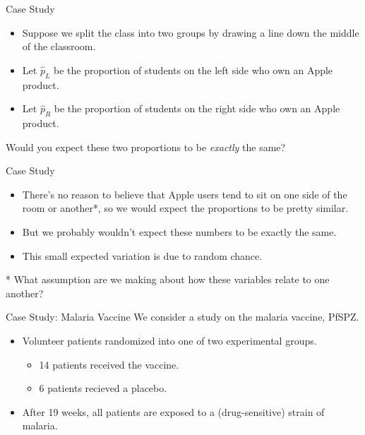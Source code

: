 \begin{frame}{Case Study}
    \begin{itemize}
        \item Suppose we split the class into two groups by drawing a line down the middle of the classroom.
        \item Let $\hat{p}_L$ be the proportion of students on the left side who own an Apple product.
        \item Let $\hat{p}_R$ be the proportion of students on the right side who own an Apple product.
    \end{itemize}
    Would you expect these two proportions to be \textit{exactly} the same?
\end{frame}

\begin{frame}{Case Study}
    \begin{itemize}
        \item There's no reason to believe that Apple users tend to sit on one side of the room or another*, so we would expect the proportions to be pretty similar.
        \item But we probably wouldn't expect these numbers to be exactly the same.
        \item This small expected variation is due to random chance.
    \end{itemize}
    
    \vspace{12pt}* What assumption are we making about how these variables relate to one another?
\end{frame}

\begin{frame}{Case Study: Malaria Vaccine}
    We consider a study on the malaria vaccine, PfSPZ. 
    \begin{itemize}
        \item Volunteer patients randomized into one of two experimental groups.
        \begin{itemize}
            \item 14 patients received the vaccine.
            \item 6 patients recieved a placebo.
        \end{itemize}
        \item After 19 weeks, all patients are exposed to a (drug-sensitive) strain of malaria.
    \end{itemize}
\end{frame}

